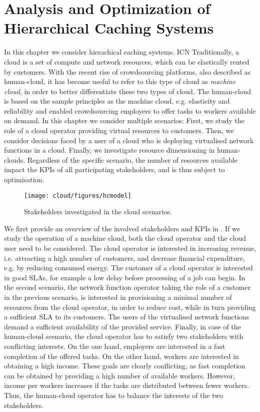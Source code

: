 \chapter{Analysis and Optimization of Hierarchical Caching Systems}\label{chap:hierarchical}

In this chapter we consider hierachical caching systems.
ICN
Traditionally, a cloud is a set of compute and network resources, which can be elastically rented by customers.
With the recent rise of crowdsourcing platforms, also described as human-cloud, it has become useful to refer to this type of cloud as \emph{machine cloud}, in order to better differentiate these two types of cloud.
The human-cloud is based on the sample principles as the machine cloud, e.g. elasticity and reliability and enabled crowdsourcing employers to offer tasks to workers available on demand.
In this chapter we consider multiple scenarios:
First, we study the role of a cloud operator providing virtual resources to customers.
Then, we consider decisions faced by a user of a cloud who is deploying virtualised network functions in a cloud.
Finally, we investigate resource dimensioning in human-clouds.
Regardless of the specific scenario, the number of resources available impact the \glspl{KPI} of all participating stakeholders, and is thus subject to optimisation.

\begin{figure}
  \centering
  \texttt{[image: cloud/figures/hcmodel]}
  \caption{Stakeholders investigated in the cloud scenarios.}
  \label{fig:hcmodel}
\end{figure}

We first provide an overview of the involved stakeholders and \glspl{KPI} in .
If we study the operation of a machine cloud, both the cloud operator and the cloud user need to be considered.
The cloud operator is interested in increasing revenue, i.e. attracting a high number of customers, and decrease financial expenditure, e.g. by reducing consumed energy.
The customer of a cloud operator is interested in good \glspl{SLA}, for example a low delay before processing of a job can begin.
In the second scenario, the network function operator taking the role of a customer in the previous scenario, is interested in provisioning a minimal number of resources from the cloud operator, in order to reduce cost, while in turn providing a sufficient \gls{SLA} to its customers.
The users of the virtualised network functions demand a sufficient availability of the provided service.
Finally, in case of the human-cloud scenario, the cloud operator has to satisfy two stakeholders with conflicting interests.
On the one hand, employers are interested in a fast completion of the offered tasks.
On the other hand, workers are interested in obtaining a high income.
These goals are clearly conflicting, as fast completion can be obtained by providing a high number of available workers.
However, income per workers increases if the tasks are distributed between fewer workers.
Thus, the human-cloud operator has to balance the interests of the two stakeholders.


